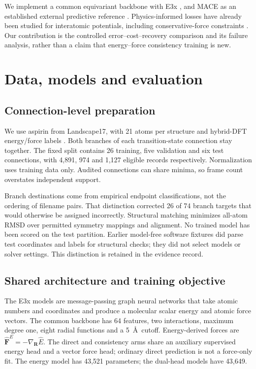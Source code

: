 \documentclass{article}
\begin{document}
We implement a common equivariant backbone with E3x \cite{e3x}, and MACE as an established external predictive reference \cite{mace}. Physics-informed losses have already been studied for interatomic potentials, including conservative-force constraints \cite{takamoto}. Our contribution is the controlled error--cost--recovery comparison and its failure analysis, rather than a claim that energy--force consistency training is new.
\section{Data, models and evaluation}
\subsection{Connection-level preparation}
We use aspirin from Landscape17, with 21 atoms per structure and hybrid-DFT energy/force labels \cite{landscape}. Both branches of each transition-state connection stay together. The fixed split contains 26 training, five validation and six test connections, with 4,891, 974 and 1,127 eligible records respectively. Normalization uses training data only. Audited connections can share minima, so frame count overstates independent support.

Branch destinations come from empirical endpoint classifications, not the ordering of filename pairs. That distinction corrected 26 of 74 branch targets that would otherwise be assigned incorrectly. Structural matching minimizes all-atom RMSD over permitted symmetry mappings and alignment. No trained model has been scored on the test partition. Earlier model-free software fixtures did parse test coordinates and labels for structural checks; they did not select models or solver settings. This distinction is retained in the evidence record.
\subsection{Shared architecture and training objective}
The E3x models are message-passing graph neural networks that take atomic numbers and coordinates and produce a molecular scalar energy and atomic force vectors. The common backbone has 64 features, two interactions, maximum degree one, eight radial functions and a 5~\AA\ cutoff. Energy-derived forces are $\widehat{\mathbf F}^{E}=-\nabla_{\mathbf R}\widehat E$. The direct and consistency arms share an auxiliary supervised energy head and a vector force head; ordinary direct prediction is not a force-only fit. The energy model has 43,521 parameters; the dual-head models have 43,649.
\end{document}
